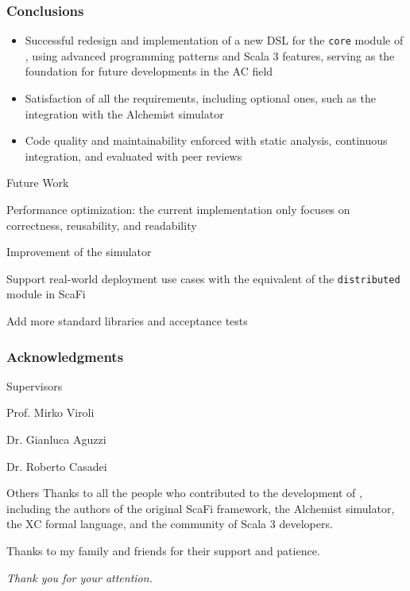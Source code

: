 \begin{frame}
    \frametitle{Conclusions}
    \begin{itemize}
        \item Successful redesign and implementation of a new \ac{DSL} for the \texttt{core} module of \this, using advanced programming patterns and Scala 3 features, serving as the foundation for future developments in the \ac{AC} field
        \item Satisfaction of all the requirements, including optional ones, such as the integration with the Alchemist simulator
        \item Code quality and maintainability enforced with static analysis, continuous integration, and evaluated with peer reviews
    \end{itemize}
    \begin{blockitems}{Future Work}
        \item Performance optimization: the current implementation only focuses on correctness, reusability, and readability
        \item Improvement of the simulator
        \item Support real-world deployment use cases with the equivalent of the \texttt{distributed} module in ScaFi
        \item Add more standard libraries and acceptance tests
    \end{blockitems}
\end{frame}

\begin{frame}
    \frametitle{Acknowledgments}
    \begin{blockitems}{Supervisors}
        \item Prof. Mirko Viroli
        \item Dr. Gianluca Aguzzi
        \item Dr. Roberto Casadei
    \end{blockitems}
    \begin{block}{Others}
        Thanks to all the people who contributed to the development of \this, including the authors of the original ScaFi framework, the Alchemist simulator, the \ac{XC} formal language, and the community of Scala 3 developers.

        Thanks to my family and friends for their support and patience.

        \textit{Thank you for your attention.}
    \end{block}
\end{frame}
